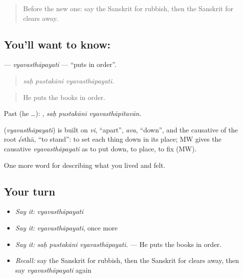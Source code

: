 \label{lesson:SA-C510-vyavasthapayati}



\begin{quote}
Before the new one: say the Sanskrit for rubbish, then the Sanskrit for clears away.
\end{quote}

\subsection*{You'll want to know: }
\textbf{} — \emph{vyavasthāpayati} — \textquotedblleft{}puts in order\textquotedblright{}.

\begin{quote}
  
\end{quote}

\begin{quote}
\emph{saḥ pustakāni vyavasthāpayati.}
\end{quote}

\begin{quote}
He puts the books in order.
\end{quote}

Past (he …):   , \emph{saḥ pustakāni vyavasthāpitavān}.

\begin{cousinweb}
\textbf{} (\emph{vyavasthāpayati}) is built on \emph{vi}, \textquotedblleft{}apart\textquotedblright{}, \emph{ava}, \textquotedblleft{}down\textquotedblright{}, and the causative of the root √sthā, \textquotedblleft{}to stand\textquotedblright{}: to set each thing down in its place; MW gives the causative \emph{vyavasthāpayati} as to put down, to place, to fix (MW).
\end{cousinweb}

\begin{grammarlens}[title={What you've built}]
One more word for describing what you lived and felt.
\end{grammarlens}

\subsection*{Your turn}
\begin{itemize}
\raggedright
  \item \emph{Say it:} \emph{vyavasthāpayati}
  \item \emph{Say it:} \emph{vyavasthāpayati}, once more
  \item \emph{Say it:} \emph{saḥ pustakāni vyavasthāpayati.} — He puts the books in order.
  \item \emph{Recall:} say the Sanskrit for rubbish, then the Sanskrit for clears away, then say \emph{vyavasthāpayati} again
\end{itemize}

